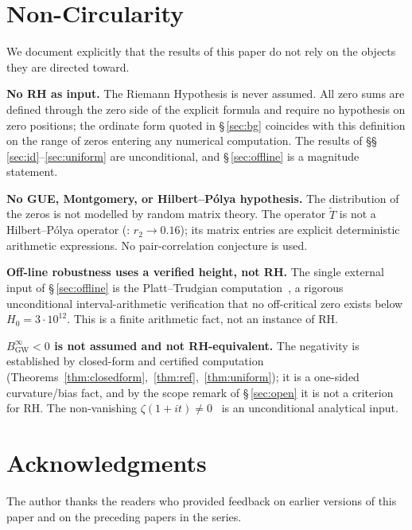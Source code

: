 \documentclass[11pt]{article}
\newcommand{\Tt}{\widetilde{T}}
\newcommand{\BinfGW}{B_{\mathrm{GW}}^{\infty}}   %
\begin{document}
\section*{Non-Circularity}
\label{sec:nocirc}

We document explicitly that the results of this paper do not rely on the
objects they are directed toward.

\textbf{No RH as input.}
The Riemann Hypothesis is never assumed.
All zero sums are defined through the zero side of the explicit formula and
require no hypothesis on zero positions; the ordinate form quoted in
\S\,\ref{sec:bg} coincides with this definition on the range of zeros
entering any numerical computation.
The results of \S\S\,\ref{sec:id}--\ref{sec:uniform} are unconditional, and
\S\,\ref{sec:offline} is a magnitude statement.

\textbf{No GUE, Montgomery, or Hilbert--P\'olya hypothesis.}
The distribution of the zeros is not modelled by random matrix theory.
The operator $\Tt$ is not a Hilbert--P\'olya operator (\cite{Paper4}:
$r_2\to 0.16$); its matrix entries are explicit deterministic arithmetic
expressions.
No pair-correlation conjecture is used.

\textbf{Off-line robustness uses a verified height, not RH.}
The single external input of \S\,\ref{sec:offline} is the Platt--Trudgian
computation~\cite{PlattTrudgian21}, a rigorous unconditional
interval-arithmetic verification that no off-critical zero exists below
$H_0=3\cdot10^{12}$.
This is a finite arithmetic fact, not an instance of RH.

\textbf{$\BinfGW<0$ is not assumed and not RH-equivalent.}
The negativity is established by closed-form and certified computation
(Theorems~\ref{thm:closedform},~\ref{thm:ref},~\ref{thm:uniform}); it is a
one-sided curvature/bias fact, and by the scope remark of \S\,\ref{sec:open}
it is not a criterion for RH.
The non-vanishing $\zeta(1+it)\ne 0$~\cite{Hadamard,dlVP} is an
unconditional analytical input.

\section*{Acknowledgments}

The author thanks the readers who provided feedback on earlier versions of
this paper and on the preceding papers in the series.
\end{document}
